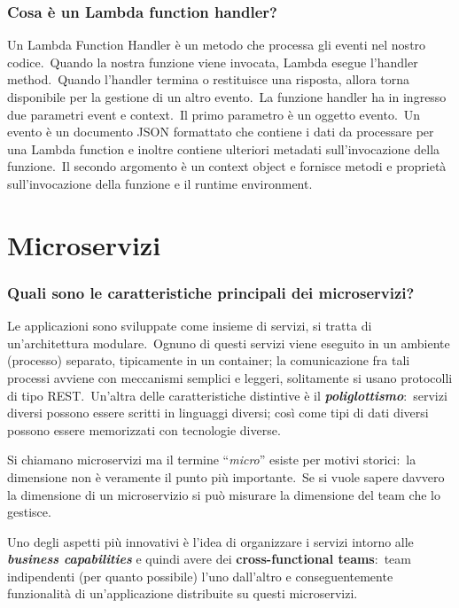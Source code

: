 \documentclass[12pt, a4paper]{article}
\begin{document}
\subsubsection*{Cosa è un Lambda function handler?}

Un Lambda Function Handler è un metodo che processa gli eventi nel nostro codice.\
Quando la nostra funzione viene invocata, Lambda esegue l'handler method.\ 
Quando l'handler termina o restituisce una risposta, allora torna disponibile per la gestione di un altro evento.\
La funzione handler ha in ingresso due parametri event e context.\
Il primo parametro è un oggetto evento.\
Un evento è un documento JSON formattato che contiene i dati da processare per una Lambda function e inoltre contiene ulteriori metadati sull'invocazione della funzione.\
Il secondo argomento è un context object e fornisce metodi e proprietà sull'invocazione della funzione e il runtime environment.

\section{Microservizi}

\subsubsection*{Quali sono le caratteristiche principali dei microservizi?}
Le applicazioni sono sviluppate come insieme di servizi, si tratta di un'architettura modulare.\
Ognuno di questi servizi viene eseguito in un ambiente (processo) separato, tipicamente in un container; la comunicazione fra tali processi avviene con meccanismi semplici e leggeri, solitamente si usano protocolli di tipo REST.\
Un'altra delle caratteristiche distintive è il \textbf{\textit{poliglottismo}}:\ servizi diversi possono essere scritti in linguaggi diversi; così come tipi di dati diversi possono essere memorizzati con tecnologie diverse.\

Si chiamano microservizi ma il termine ``\textit{micro}'' esiste per motivi storici:\ la dimensione non è veramente il punto più importante.\
Se si vuole sapere davvero la dimensione di un microservizio si può misurare la dimensione del team che lo gestisce.\

Uno degli aspetti più innovativi è l'idea di organizzare i servizi intorno alle \textbf{\textit{business capabilities}} e quindi avere dei \textbf{cross-functional teams}:\ team indipendenti (per quanto possibile) l'uno dall'altro e conseguentemente funzionalità di un'applicazione distribuite su questi microservizi.\
\end{document}
